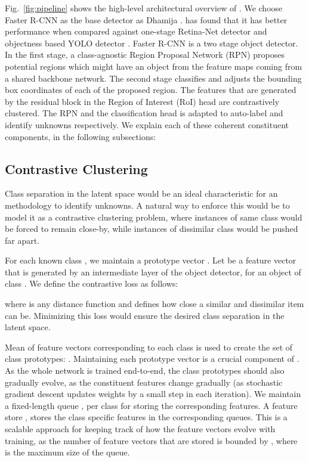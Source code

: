 \documentclass[final]{cvpr}
\begin{document}
Fig.~\ref{fig:pipeline} shows the high-level architectural overview of \method. We choose Faster R-CNN \cite{ren2015faster} as the base detector as Dhamija \etal.  \cite{dhamija2020overlooked} has found that it has better \os performance when compared against one-stage Retina-Net detector \cite{lin2017focal} and objectness based YOLO  detector \cite{redmon2016you}. 
Faster R-CNN \cite{ren2015faster} is a two stage object detector. In the first stage, a class-agnostic Region Proposal Network (RPN) proposes potential regions which might have an object from the feature maps coming from a shared backbone network. The second stage classifies and adjusts the bounding box coordinates of each of the proposed region. 
The features that are generated by the residual block in the Region of Interest (RoI) head are contrastively clustered.
The RPN and the classification head is adapted to auto-label and identify unknowns respectively. We explain each of these coherent constituent components, in the following subsections: 

\subsection{Contrastive Clustering} \label{sec:contrastive_clustering}
Class separation in the latent space would be an ideal characteristic for an \OW methodology to identify unknowns. A natural way to enforce this would be to model it as a contrastive clustering problem, where instances of same class would be forced to remain close-by, while instances of dissimilar class would be pushed far apart. 

For each known class , we maintain a prototype vector . Let  be a feature vector that is generated by an intermediate layer of the object detector, for an object of class . We define the contrastive loss as follows:

where  is any distance function and  defines how close a similar and dissimilar item can be. Minimizing this loss would ensure the desired class separation in the latent space. 

Mean of feature vectors corresponding to each class is used to create the set of class prototypes: . Maintaining each prototype vector is a crucial component of \method. As the whole network is trained end-to-end, the class prototypes should also gradually evolve, as the constituent features change gradually (as stochastic gradient descent  updates weights by a small step in each iteration). We maintain a fixed-length queue , per class for storing the corresponding features. A feature store , stores the class specific features in the corresponding queues. This is a scalable approach for keeping track of how the feature vectors evolve with training, as the number of feature vectors that are stored is bounded by , where  is the maximum size of the queue.
\end{document}

